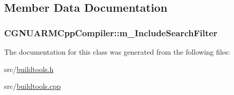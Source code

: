 \subsection{Member Data Documentation}
\hypertarget{classCGNUARMCppCompiler_a18c1f490cdec9e19133ae5782554b073}{
\subsubsection[{m\-\_\-\-Include\-Search\-Filter}]{ C\-G\-N\-U\-A\-R\-M\-Cpp\-Compiler\-::m\-\_\-\-Include\-Search\-Filter\hspace{0.3cm}{\ttfamily [private]}}}\label{classCGNUARMCppCompiler_a18c1f490cdec9e19133ae5782554b073}


The documentation for this class was generated from the following files\-:\begin{DoxyCompactItemize}
\item 
src/\hyperlink{buildtools_8h}{buildtools.\-h}\item 
src/\hyperlink{buildtools_8cpp}{buildtools.\-cpp}\end{DoxyCompactItemize}
